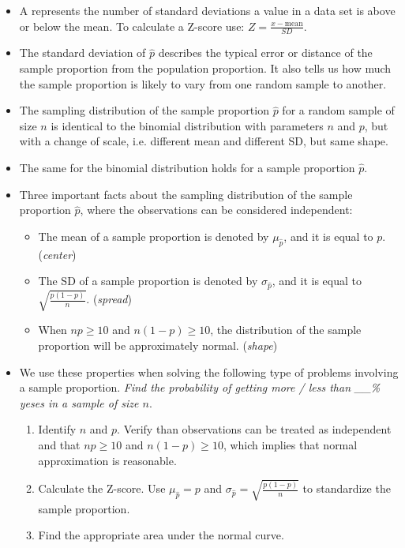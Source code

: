 \begin{itemize}
\item A  represents the number of standard deviations a value in a data set is above or below the mean.  To calculate a \mbox{Z-score} use: $Z = \frac{x-\text{mean}}{SD}$.  

\item The standard deviation of $\hat{p}$ describes the typical error or distance of the sample proportion from the population proportion.  It also tells us how much the sample proportion is likely to vary from one random sample to another.  


\item The sampling distribution of the sample proportion $\hat{p}$ for a random sample of size $n$ is identical to the binomial distribution with parameters $n$ and $p$, but with a change of scale, i.e. different mean and different SD, but same shape.

\item The same  for the binomial distribution holds for a sample proportion $\hat{p}$.

\item Three important facts about the sampling distribution of the sample proportion $\hat{p}$, where the observations can be considered independent:
\begin{itemize}\vspace{-1mm}
\item The mean of a sample proportion is denoted by $\mu_{\hat{p}}$, and it is equal to $p$.  (\textit{center})
\item The SD of a sample proportion is denoted by $\sigma_{\hat{p}}$, and it is equal to $\sqrt{\frac{p(1-p)}{n}}$.  (\textit{spread})
\item When $np\ge 10$ and $n(1-p)\ge 10$, the distribution of the sample proportion will be approximately normal.   (\textit{shape})
\end{itemize}

\item We use these properties when solving the following type of  problems involving a sample proportion.  
\emph{Find the probability of getting more / less than \_\_\% yeses in a sample of size $n$}.
\begin{enumerate}\vspace{-1mm}
\setlength{\itemsep}{0mm}
\item Identify $n$ and $p$. Verify than observations can be treated as independent and that $np\ge 10$ and $n(1-p)\ge 10$, which implies that normal approximation is reasonable. 
\item Calculate the Z-score.  Use $\mu_{\hat{p}} = p$ and $\sigma_{\hat{p}} = \sqrt{\frac{p(1-p)}{n}}$ to standardize the sample proportion.  
\item Find the appropriate area under the normal curve.  \end{enumerate}

\end{itemize}

